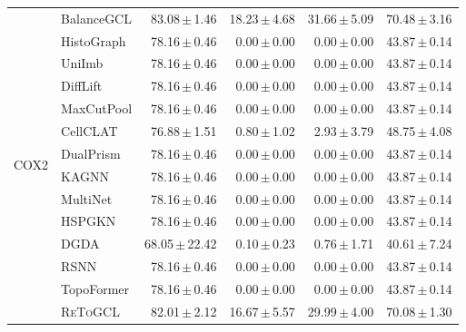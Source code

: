 \documentclass[10pt,twocolumn]{article}
\newcommand{\method}{\textsc{ReToGCL}}
\newcommand{\res}[2]{#1\,$\pm$\,#2}
\begin{document}
\begin{longtable}{@{}llrrrr@{}}
\multirow{14}{*}{COX2}
& BalanceGCL & \res{83.08}{1.46} & \res{18.23}{4.68} & \res{31.66}{5.09} & \res{70.48}{3.16}\\
& HistoGraph & \res{78.16}{0.46} & \res{0.00}{0.00} & \res{0.00}{0.00} & \res{43.87}{0.14}\\
& UniImb & \res{78.16}{0.46} & \res{0.00}{0.00} & \res{0.00}{0.00} & \res{43.87}{0.14}\\
& DiffLift & \res{78.16}{0.46} & \res{0.00}{0.00} & \res{0.00}{0.00} & \res{43.87}{0.14}\\
& MaxCutPool & \res{78.16}{0.46} & \res{0.00}{0.00} & \res{0.00}{0.00} & \res{43.87}{0.14}\\
& CellCLAT & \res{76.88}{1.51} & \res{0.80}{1.02} & \res{2.93}{3.79} & \res{48.75}{4.08}\\
& DualPrism & \res{78.16}{0.46} & \res{0.00}{0.00} & \res{0.00}{0.00} & \res{43.87}{0.14}\\
& KAGNN & \res{78.16}{0.46} & \res{0.00}{0.00} & \res{0.00}{0.00} & \res{43.87}{0.14}\\
& MultiNet & \res{78.16}{0.46} & \res{0.00}{0.00} & \res{0.00}{0.00} & \res{43.87}{0.14}\\
& HSPGKN & \res{78.16}{0.46} & \res{0.00}{0.00} & \res{0.00}{0.00} & \res{43.87}{0.14}\\
& DGDA & \res{68.05}{22.42} & \res{0.10}{0.23} & \res{0.76}{1.71} & \res{40.61}{7.24}\\
& RSNN & \res{78.16}{0.46} & \res{0.00}{0.00} & \res{0.00}{0.00} & \res{43.87}{0.14}\\
& TopoFormer & \res{78.16}{0.46} & \res{0.00}{0.00} & \res{0.00}{0.00} & \res{43.87}{0.14}\\
\rowcolor{topologypurple!45}& \method{} & \res{82.01}{2.12} & \res{16.67}{5.57} & \res{29.99}{4.00} & \res{70.08}{1.30}\\
\midrule


\end{longtable}
\end{document}
